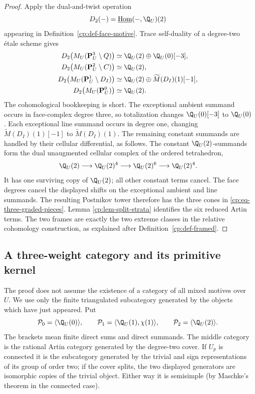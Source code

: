 \begin{proof}
Apply the dual-and-twist operation
\[
 D_2(-)=\underline{\operatorname{Hom}}(-,\Q_U)(2)
\]
appearing in Definition~\ref{cp:def-face-motive}.  Trace self-duality of a
degree-two \'{e}tale scheme gives
\begin{align*}
 D_2\bigl(M_U(\mathbf P^3_U\setminus Q)\bigr)&\simeq
      \Q_U(2)\oplus\Q_U(0)[-3],\\
 D_2\bigl(M_U(\mathbf P^2_U\setminus C)\bigr)&\simeq\Q_U(2),\\
 D_2\bigl(M_U(\mathbf P^1_U\setminus D_I)\bigr)&\simeq
      \Q_U(2)\oplus\widetilde M(D_I)(1)[-1],\\
 D_2\bigl(M_U(\mathbf P^0_U)\bigr)&\simeq\Q_U(2).
\end{align*}
The cohomological bookkeeping is short.  The exceptional ambient summand
occurs in face-complex degree three, so totalization changes
\(\Q_U(0)[-3]\) to \(\Q_U(0)\).  Each exceptional line summand occurs in
degree one, changing \(\widetilde M(D_I)(1)[-1]\) to
\(\widetilde M(D_I)(1)\).  The remaining constant summands are handled by
their cellular differential, as follows.
The constant \(\Q_U(2)\)-summands form the dual unaugmented cellular
complex of the ordered tetrahedron,
\[
 \Q_U(2)\longrightarrow\Q_U(2)^4\longrightarrow
 \Q_U(2)^6\longrightarrow\Q_U(2)^4.
\]
It has one surviving copy of \(\Q_U(2)\); all other constant terms cancel.
The face degrees cancel the displayed shifts on the exceptional ambient and
line summands.  The resulting Postnikov tower therefore has the three cones
in \eqref{cp:eq-three-graded-pieces}.  Lemma
\ref{cp:lem-split-strata} identifies the six reduced Artin terms.  The two
frames are exactly the two extreme classes in the relative cohomology
construction, as explained after Definition~\ref{cp:def-framed}.
\end{proof}

\subsection{A three-weight category and its primitive kernel}

The proof does not assume the existence of a category of all mixed motives
over \(U\).  We use only the finite triangulated subcategory generated by
the objects which have just appeared.  Put
\begin{equation}
 \mathcal P_0=\langle\Q_U(0)\rangle,
 \qquad
 \mathcal P_1=\langle\Q_U(1),\chi(1)\rangle,
 \qquad
 \mathcal P_2=\langle\Q_U(2)\rangle.
 \label{cp:eq-pure-categories}
\end{equation}
The brackets mean finite direct sums and direct summands.  The middle
category is the rational Artin category generated by the degree-two cover.
If \(U_p\) is connected it is the subcategory generated by the trivial and
sign representations of its group of order two; if the cover splits, the
two displayed generators are isomorphic copies of the trivial object.
Either way it is semisimple (by Maschke's theorem in the connected case).

